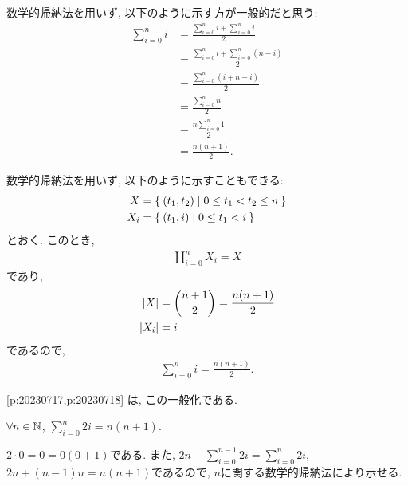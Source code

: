 \begin{rem}
  数学的帰納法を用いず, 以下のように示す方が一般的だと思う:
  \begin{align*}
    \sum_{i=0}^{n}i&=\frac{\sum_{i=0}^{n}i + \sum_{i=0}^{n}i}{2}\\
    &=\frac{\sum_{i=0}^{n}i + \sum_{i=0}^{n}(n-i)}{2}\\
    &=\frac{\sum_{i=0}^{n}(i + n-i)}{2}\\
    &=\frac{\sum_{i=0}^{n}n}{2}\\
    &=\frac{n\sum_{i=0}^{n}1}{2}\\
    &=\frac{n(n+1)}{2}.
  \end{align*}
\end{rem}

\begin{rem}
  数学的帰納法を用いず, 以下のように示すこともできる:
  \begin{align*}
    X&=\Set{(t_1,t_2)|0\leq t_1<t_2 \leq  n}\\
    X_i&=\Set{(t_1,i)|0\leq t_1<i }
  \end{align*}
  とおく. このとき,
  \begin{align*}
    \coprod_{i=0}^{n}X_i = X
  \end{align*}
  であり,
  \begin{align*}
    \left|X\right|&=\binom{n+1}{2}=\frac{n(n+1)}{2}\\
    \left|X_i\right|&=i
  \end{align*}
  であるので,
  \begin{align*}
    \sum_{i=0}^{n}i=\frac{n(n+1)}{2}.
  \end{align*}
\end{rem}

\begin{rem}
\cref{p:20230717,p:20230718}
は,
この一般化である.
\end{rem}

\begin{prop}
  \label{p:20230703}
  $\forall n\in\mathbb{N}$,
  $\sum_{i=0}^{n}2i=n(n+1).$
\end{prop}
\begin{proof**}
  $2\cdot 0=0=0(0+1)$である.
  また,
  $2n+\sum_{i=0}^{n-1}2i=\sum_{i=0}^{n}2i$,
  $2n+(n-1)n=n(n+1)$であるので,
  $n$に関する数学的帰納法により示せる.
\end{proof**}


